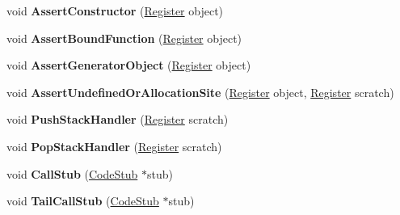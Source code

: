 \begin{DoxyCompactItemize}
void {\bfseries Assert\+Constructor} (\mbox{\hyperlink{classv8_1_1internal_1_1Register}{Register}} object)
\item 
\mbox{\label{classv8_1_1internal_1_1MacroAssembler_acbd0894b4e268684a580f99882497aed}} 
void {\bfseries Assert\+Bound\+Function} (\mbox{\hyperlink{classv8_1_1internal_1_1Register}{Register}} object)
\item 
\mbox{\label{classv8_1_1internal_1_1MacroAssembler_aa71ed557199e69728a422efb18e8fc65}} 
void {\bfseries Assert\+Generator\+Object} (\mbox{\hyperlink{classv8_1_1internal_1_1Register}{Register}} object)
\item 
\mbox{\label{classv8_1_1internal_1_1MacroAssembler_ac5a6e24ffce5d432cf0bf668b8460ff5}} 
void {\bfseries Assert\+Undefined\+Or\+Allocation\+Site} (\mbox{\hyperlink{classv8_1_1internal_1_1Register}{Register}} object, \mbox{\hyperlink{classv8_1_1internal_1_1Register}{Register}} scratch)
\item 
\mbox{\label{classv8_1_1internal_1_1MacroAssembler_a89a0ed9cf9b810ece9db3b225e27dac2}} 
void {\bfseries Push\+Stack\+Handler} (\mbox{\hyperlink{classv8_1_1internal_1_1Register}{Register}} scratch)
\item 
\mbox{\label{classv8_1_1internal_1_1MacroAssembler_ac9657170794e5a8c4f3612948c7fbe17}} 
void {\bfseries Pop\+Stack\+Handler} (\mbox{\hyperlink{classv8_1_1internal_1_1Register}{Register}} scratch)
\item 
\mbox{\label{classv8_1_1internal_1_1MacroAssembler_a6775ba7dd62249b4bd7b668d6f4c1963}} 
void {\bfseries Call\+Stub} (\mbox{\hyperlink{classv8_1_1internal_1_1CodeStub}{Code\+Stub}} $\ast$stub)
\item 
\mbox{\label{classv8_1_1internal_1_1MacroAssembler_a5255a8669ff98768dee25f5cee80363a}} 
void {\bfseries Tail\+Call\+Stub} (\mbox{\hyperlink{classv8_1_1internal_1_1CodeStub}{Code\+Stub}} $\ast$stub)
\item 
\mbox{\label{classv8_1_1internal_1_1MacroAssembler_a37081c297a4c533e549cc58167f7ccaa}} 

\end{DoxyCompactItemize}
